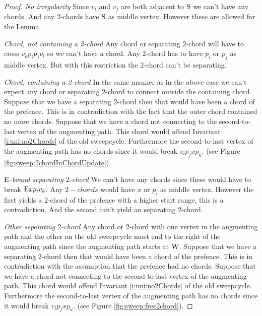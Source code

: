     \begin{proof}
      \emph{No irregularity}
      Since $v_i$ and $v_j$ are both adjacent to $\mathrm{S}$ we can't have any chords. And any $2$-chords have $\mathrm{S}$ as middle vertex. However these are allowed for the Lemma.

      \emph{Chord, not containing a 2-chord}
      Any chord or separating $2$-chord will have to cross $v_k p_i p_j v_l$ so we can't have a chord. Any 2-chord has to have $p_i$ or $p_j$ as middle vertex. But with this restriction the 2-chord can't be separating.

      \emph{Chord, containing a 2-chord}
      In the same manner as in the above case we can't expect any chord or separating 2-chord to connect outside the containing chord.
      Suppose that we have a separating $2$-chord then that would have been a chord of the prefence. This is in contradiction with the fact that the outer chord contained no more chords.
      Suppose that we have a chord not connecting to the second-to-last vertex of the augmenting path. This chord would offend Invariant \ref{i:uni:no2Chords} of the old sweepcycle. Furthermore the second-to-last vertex of the augmenting path has no chords since it would break $v_l p_j x p_u$. (see Figure \ref{fig:sweep:2chordInChordUpdate}).

      \emph{$\mathrm{E}$-bound separating $2$-chord}
      We can't have any chords since these would have to break $\mathrm{E} x p_i v_k$. Any $2-chords$ would have $x$ or $p_i$ as middle vertex. However the first yields a $2$-chord of the prefence with a higher start range, this is a contradiction. And the second can't yield an separating $2$-chord.


      \emph{Other separating $2$-chord}
      Any chord or $2$-chord with one vertex in the augmenting path and the other on the old sweepcycle must end to the right of the augmenting path since the augmenting path starts at $\mathrm{W}$.
      Suppose that we have a separating $2$-chord then that would have been a chord of the prefence. This is in contradiction with the assumption that the prefence had no chords.
      Suppose that we have a chord not connecting to the second-to-last vertex of the augmenting path. This chord would offend Invariant \ref{i:uni:no2Chords} of the old sweepcycle. Furthermore the second-to-last vertex of the augmenting path has no chords since it would break $v_l p_j x p_u$. (see Figure \ref{fig:sweep:free2chord}).
    \end{proof}

